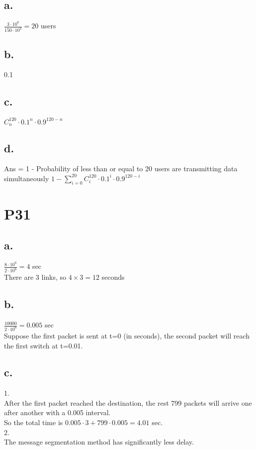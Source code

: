 \documentclass[11pt,a4paper]{article}
\begin{document}
\subsection{a.}
$\frac{3 \cdot 10^6}{150 \cdot 10^3} = 20$ users

\subsection{b.}
0.1

\subsection{c.}
$C^{120}_n \cdot 0.1^n \cdot 0.9^{120-n} $

\subsection{d.}
Ans = 1 - Probability of less than or equal to 20 users are transmitting data simultaneously
$1 - \sum^{20}_{i=0} C^{120}_i  \cdot 0.1^i \cdot 0.9^{120-i}$

\section{P31}

\subsection{a.}
$\frac{8 \cdot 10^6}{2 \cdot 10^6} = 4$ sec \\
There are 3 links, so $4 \times 3 = 12$ seconds

\subsection{b.}
$\frac{10000}{2 \cdot 10^6} = 0.005$ sec \\
Suppose the first packet is sent at t=0 (in seconds), the second packet will reach the first switch at t=0.01.

\subsection{c.} 
1. \\
After the first packet reached the destination, the rest 799 packets will arrive one after another with a 0.005 interval. \\
So the total time is $0.005 \cdot 3 + 799 \cdot 0.005 = 4.01$ sec. \\
2.\\
The message segmentation method has significantly less delay.
\end{document}
